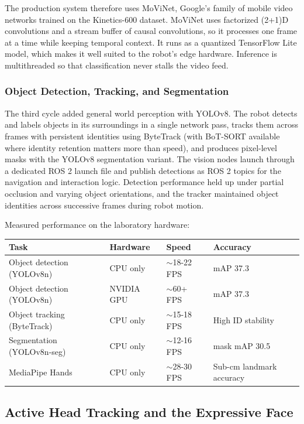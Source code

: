 \documentclass[11pt,a4paper]{article}
\begin{document}
The production system therefore uses MoViNet, Google's family of mobile video networks trained on the Kinetics-600 dataset. MoViNet uses factorized (2+1)D convolutions and a stream buffer of causal convolutions, so it processes one frame at a time while keeping temporal context. It runs as a quantized TensorFlow Lite model, which makes it well suited to the robot's edge hardware. Inference is multithreaded so that classification never stalls the video feed.

\subsubsection{Object Detection, Tracking, and Segmentation}

The third cycle added general world perception with YOLOv8. The robot detects and labels objects in its surroundings in a single network pass, tracks them across frames with persistent identities using ByteTrack (with BoT-SORT available where identity retention matters more than speed), and produces pixel-level masks with the YOLOv8 segmentation variant. The vision nodes launch through a dedicated ROS 2 launch file and publish detections as ROS 2 topics for the navigation and interaction logic. Detection performance held up under partial occlusion and varying object orientations, and the tracker maintained object identities across successive frames during robot motion.

Measured performance on the laboratory hardware:

\begin{table}[H]
\centering
\begin{tabular}{@{}llll@{}}
\toprule
\textbf{Task} & \textbf{Hardware} & \textbf{Speed} & \textbf{Accuracy} \\
\midrule
Object detection (YOLOv8n) & CPU only & $\sim$18-22 FPS & mAP 37.3 \\
Object detection (YOLOv8n) & NVIDIA GPU & $\sim$60+ FPS & mAP 37.3 \\
Object tracking (ByteTrack) & CPU only & $\sim$15-18 FPS & High ID stability \\
Segmentation (YOLOv8n-seg) & CPU only & $\sim$12-16 FPS & mask mAP 30.5 \\
MediaPipe Hands & CPU only & $\sim$28-30 FPS & Sub-cm landmark accuracy \\
\bottomrule
\end{tabular}
\end{table}

\subsection{Active Head Tracking and the Expressive Face}
\end{document}
